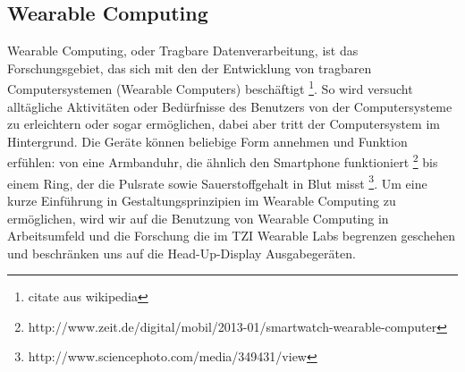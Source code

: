 








\subsection{Wearable Computing} 
\label{sub:wearable_computers}

Wearable Computing, oder Tragbare Datenverarbeitung, ist das Forschungsgebiet, das sich mit den der Entwicklung von tragbaren Computersystemen (Wearable Computers) beschäftigt \footnote{citate aus wikipedia }. So wird versucht alltägliche Aktivitäten oder Bedürfnisse des Benutzers  von der Computersysteme zu erleichtern oder sogar ermöglichen, dabei aber tritt der Computersystem im Hintergrund. Die Geräte können beliebige Form annehmen und Funktion erfühlen: von eine Armbanduhr, die ähnlich den Smartphone funktioniert \footnote{http://www.zeit.de/digital/mobil/2013-01/smartwatch-wearable-computer} bis einem  Ring, der die Pulsrate sowie Sauerstoffgehalt in Blut misst \footnote{http://www.sciencephoto.com/media/349431/view}.  Um eine kurze Einführung in Gestaltungsprinzipien im Wearable Computing zu ermöglichen, wird wir auf die Benutzung von Wearable Computing in Arbeitsumfeld und die Forschung die im TZI Wearable Labs begrenzen geschehen und beschränken uns auf die Head-Up-Display Ausgabegeräten.

